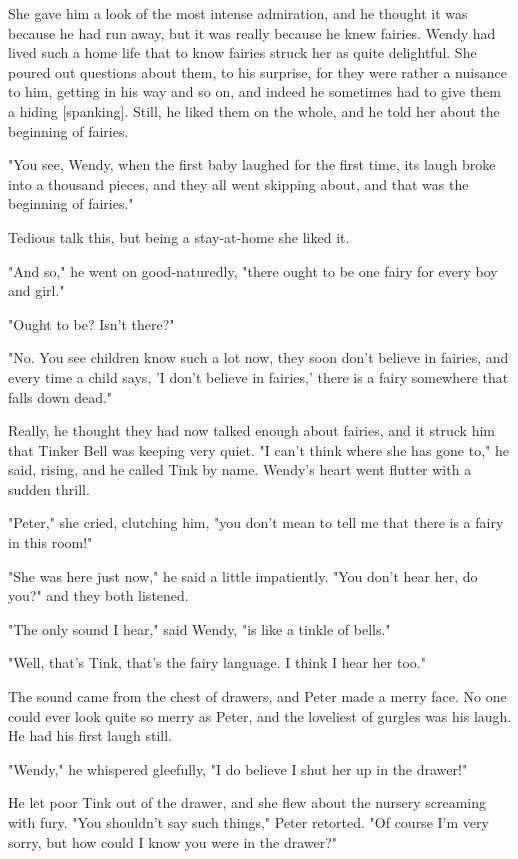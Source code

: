 She gave him a look of the most intense admiration, and he thought it was
because he had run away, but it was really because he knew fairies. Wendy
had lived such a home life that to know fairies struck her as quite
delightful. She poured out questions about them, to his surprise, for they
were rather a nuisance to him, getting in his way and so on, and indeed he
sometimes had to give them a hiding [spanking]. Still, he liked them on
the whole, and he told her about the beginning of fairies.


"You see, Wendy, when the first baby laughed for the first time, its laugh
broke into a thousand pieces, and they all went skipping about, and that
was the beginning of fairies."


Tedious talk this, but being a stay-at-home she liked it.


"And so," he went on good-naturedly, "there ought to be one fairy for
every boy and girl."


"Ought to be? Isn't there?"


"No. You see children know such a lot now, they soon don't believe in
fairies, and every time a child says, 'I don't believe in fairies,' there
is a fairy somewhere that falls down dead."


Really, he thought they had now talked enough about fairies, and it struck
him that Tinker Bell was keeping very quiet. "I can't think where she has
gone to," he said, rising, and he called Tink by name. Wendy's heart went
flutter with a sudden thrill.


"Peter," she cried, clutching him, "you don't mean to tell me that there
is a fairy in this room!"


"She was here just now," he said a little impatiently. "You don't hear
her, do you?" and they both listened.


"The only sound I hear," said Wendy, "is like a tinkle of bells."


"Well, that's Tink, that's the fairy language. I think I hear her too."


The sound came from the chest of drawers, and Peter made a merry face. No
one could ever look quite so merry as Peter, and the loveliest of gurgles
was his laugh. He had his first laugh still.


"Wendy," he whispered gleefully, "I do believe I shut her up in the
drawer!"


He let poor Tink out of the drawer, and she flew about the nursery
screaming with fury. "You shouldn't say such things," Peter retorted. "Of
course I'm very sorry, but how could I know you were in the drawer?"


